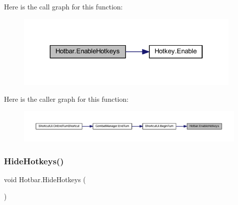 Here is the call graph for this function\+:\nopagebreak
\begin{figure}[H]
\begin{center}
\leavevmode
\includegraphics[width=310pt]{class_hotbar_a37bca03a1dfd144a30bae3774eaab667_cgraph}
\end{center}
\end{figure}
Here is the caller graph for this function\+:\nopagebreak
\begin{figure}[H]
\begin{center}
\leavevmode
\includegraphics[width=350pt]{class_hotbar_a37bca03a1dfd144a30bae3774eaab667_icgraph}
\end{center}
\end{figure}
\mbox{\label{class_hotbar_a2f8af9863292223ae00d361121164160}} 
\subsubsection{\texorpdfstring{HideHotkeys()}{HideHotkeys()}}
{\footnotesize\ttfamily void Hotbar.\+Hide\+Hotkeys (\begin{DoxyParamCaption}{ }\end{DoxyParamCaption})}

